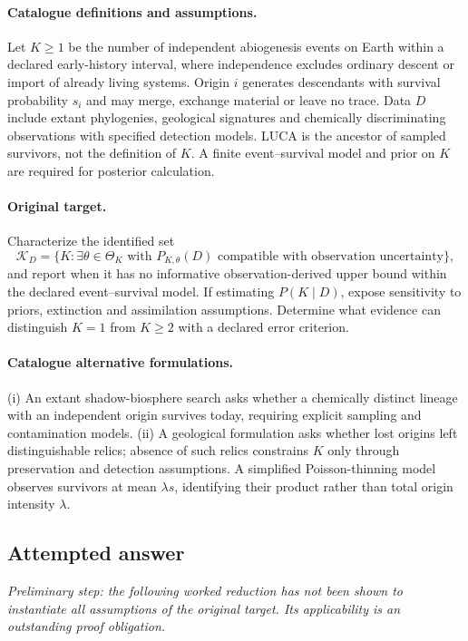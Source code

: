\documentclass[11pt]{article}
\begin{document}
\paragraph{Catalogue definitions and assumptions.}
Let $K\geq1$ be the number of independent abiogenesis events on Earth within a declared early-history interval, where independence excludes ordinary descent or import of already living systems. Origin $i$ generates descendants with survival probability $s_i$ and may merge, exchange material or leave no trace. Data $D$ include extant phylogenies, geological signatures and chemically discriminating observations with specified detection models. LUCA is the ancestor of sampled survivors, not the definition of $K$. A finite event--survival model and prior on $K$ are required for posterior calculation.
\paragraph{Original target.}
Characterize the identified set
\[
\mathcal K_D=\{K:\exists\theta\in\Theta_K\text{ with }P_{K,\theta}(D)
\text{ compatible with observation uncertainty}\},
\]
and report when it has no informative observation-derived upper bound within the declared event--survival model. If estimating $P(K\mid D)$, expose sensitivity to priors, extinction and assimilation assumptions. Determine what evidence can distinguish $K=1$ from $K\geq2$ with a declared error criterion.
\paragraph{Catalogue alternative formulations.}
(i) An extant shadow-biosphere search asks whether a chemically distinct lineage with an independent origin survives today, requiring explicit sampling and contamination models. (ii) A geological formulation asks whether lost origins left distinguishable relics; absence of such relics constrains $K$ only through preservation and detection assumptions. A simplified Poisson-thinning model observes survivors at mean $\lambda s$, identifying their product rather than total origin intensity $\lambda$.
\subsection{Attempted answer}
\noindent\emph{Preliminary step: the following worked reduction has not been shown to instantiate all assumptions of the original target. Its applicability is an outstanding proof obligation.}
\end{document}

